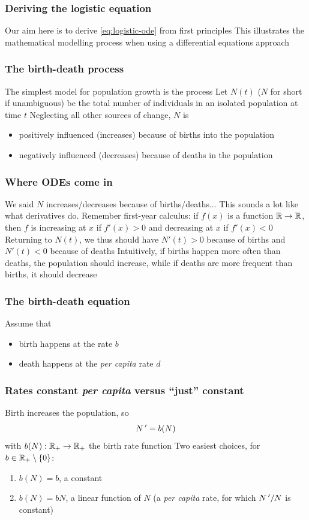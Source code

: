 \documentclass[aspectratio=169]{beamer}
\begin{document}
\begin{frame}\frametitle{Deriving the logistic equation}
Our aim here is to derive \eqref{eq:logistic-ode} from first principles
\vfill
This illustrates the mathematical modelling process when using a differential equations approach
\end{frame}

\begin{frame}\frametitle{The birth-death process}
The simplest model for population growth is the  process
\vfill
Let $N(t)$ ($N$ for short if unambiguous) be the total number of individuals in an isolated population at time $t$
\vfill
Neglecting all other sources of change, $N$ is
\begin{itemize}
\item positively influenced (increases) because of births into the population
\item negatively influenced (decreases) because of deaths in the population
\end{itemize}
\end{frame}

\begin{frame}\frametitle{Where ODEs come in}
We said $N$ increases/decreases because of births/deaths...
\vfill
This sounds a lot like what derivatives do. Remember first-year calculus: if $f(x)$ is a function $\mathbb{R}\to\mathbb{R}$, then $f$ is increasing at $x$ if $f'(x)>0$ and decreasing at $x$ if $f'(x)<0$
\vfill
Returning to $N(t)$, we thus should have $N'(t)>0$ because of births and $N'(t)<0$ because of deaths
\vfill
Intuitively, if births happen more often than deaths, the population should increase, while if deaths are more frequent than births, it should decrease
\end{frame}


\begin{frame}\frametitle{The birth-death equation}
Assume that
\vfill
\begin{itemize}
\item birth happens at the  rate $b$
\vfill
\item death happens at the \emph{per capita} rate $d$
\end{itemize}
\end{frame}

\begin{frame}\frametitle{Rates constant \emph{per capita} versus ``just'' constant}
Birth increases the population, so
\[
N\,' = b(N)
\]
with $b(N):\mathbb{R}_+\to\mathbb{R}_+$ the birth rate function
\vfill
Two easiest choices, for $b\in\mathbb{R}_+\setminus\{0\}$:
\begin{enumerate}
\item $b(N)=b$, a constant
\item $b(N)=bN$, a linear function of $N$ (a \emph{per capita} rate, for which $N\,'/N$ is constant)
\end{enumerate}
\end{frame}
\end{document}
